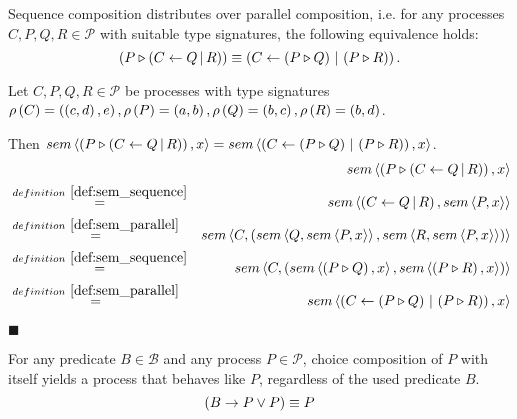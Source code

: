 \begin{theorem}
\label{thm:distributivity_sequence_parallel}
Sequence composition distributes over parallel composition, i.e. for any processes $C, P, Q, R \in \mathcal{P}$ with suitable type signatures, the following equivalence holds:
\begin{equation*}
  \left( P \triangleright \left( C \gets Q \, | \, R \right) \right) \equiv \left( C \gets \left( P \triangleright Q \right) \, | \, \left( P \triangleright R \right) \right).
\end{equation*}
\end{theorem}

\begin{myproof}
Let $C, P, Q, R \in \mathcal{P}$ be processes with type signatures $\rho \left( C \right) = \left( \left( c, d \right), e \right), \rho \left( P \right) = \left( a, b \right), \rho \left( Q \right) = \left( b, c \right), \rho \left( R \right) = \left( b, d \right)$.

Then $sem \left\langle \left( P \triangleright \left( C \gets Q \, | \, R \right) \right), x \right\rangle = sem \left\langle \left( C \gets \left( P \triangleright Q \right) \, | \, \left( P \triangleright R \right) \right), x \right\rangle$.
\begin{eqnarray*}
  & & \sem{\sequence{P}{\parallel{C}{Q}{R}}}{x} \\
  & \overset{\defref{def:sem_sequence}}{=} & \sem{\parallel{C}{Q}{R}}{\sem{P}{x}} \\
  & \overset{\defref{def:sem_parallel}}{=} & \sem{C}{\left( \sem{Q}{\sem{P}{x}}, \sem{R}{\sem{P}{x}} \right)} \\
  & \overset{\defref{def:sem_sequence}}{=} & \sem{C}{\left( \sem{\sequence{P}{Q}}{x}, \sem{\sequence{P}{R}}{x} \right)} \\
  & \overset{\defref{def:sem_parallel}}{=} & \sem{\parallel{C}{\sequence{P}{Q}}{\sequence{P}{R}}}{x}
\end{eqnarray*}

\hfill$\blacksquare$
\end{myproof}


\begin{theorem}
\label{thm:idempotence_choice}
For any predicate $B \in \mathcal{B}$ and any process $P \in \mathcal{P}$, choice composition of $P$ with itself yields a process that behaves like $P$, regardless of the used predicate $B$.
\begin{equation*}
  \left( B \to P \vee P \right) \equiv P
\end{equation*}
\end{theorem}

